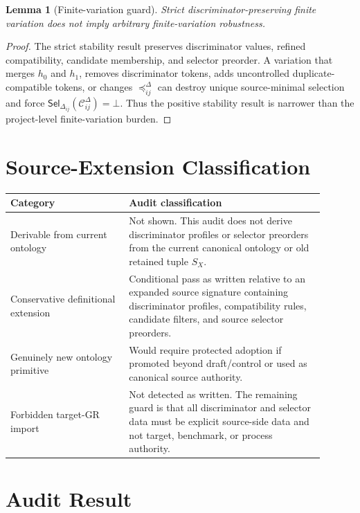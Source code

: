 \documentclass[11pt]{article}
\newcommand{\SX}{S_X}
\newcommand{\Cand}{\mathcal{C}^{\Delta}}
\newcommand{\Sel}{\mathsf{Sel}_{\Delta}}
\newtheorem{lemma}{Lemma}
\begin{document}
\begin{lemma}[Finite-variation guard]
Strict discriminator-preserving finite variation does not imply arbitrary
finite-variation robustness.
\end{lemma}

\begin{proof}
The strict stability result preserves discriminator values, refined
compatibility, candidate membership, and selector preorder. A variation that
merges \(h_0\) and \(h_1\), removes discriminator tokens, adds uncontrolled
duplicate-compatible tokens, or changes \(\preceq_{ij}^{\Delta}\) can destroy
unique source-minimal selection and force \(\Sel_{ij}(\Cand_{ij})=\bot\).
Thus the positive stability result is narrower than the project-level
finite-variation burden.
\end{proof}

\section{Source-Extension Classification}

\begin{center}
\begin{tabular}{p{0.34\linewidth}p{0.56\linewidth}}
\hline
Category & Audit classification \\
\hline
Derivable from current ontology & Not shown. This audit does not derive
discriminator profiles or selector preorders from the current canonical
ontology or old retained tuple \(\SX\). \\
Conservative definitional extension & Conditional pass as written relative to
an expanded source signature containing discriminator profiles, compatibility
rules, candidate filters, and source selector preorders. \\
Genuinely new ontology primitive & Would require protected adoption if
promoted beyond draft/control or used as canonical source authority. \\
Forbidden target-GR import & Not detected as written. The remaining guard is
that all discriminator and selector data must be explicit source-side data and
not target, benchmark, or process authority. \\
\hline
\end{tabular}
\end{center}

\section{Audit Result}
\end{document}
